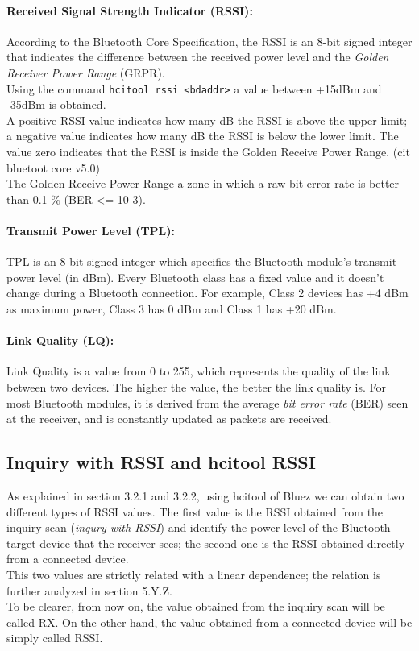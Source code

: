 \paragraph{Received Signal Strength Indicator (RSSI):}
According to the Bluetooth Core Specification, the RSSI is an 8-bit signed integer that indicates the difference between the received power level and the \textit{Golden Receiver Power Range} (GRPR). \\
Using the command \texttt{hcitool rssi \textless bdaddr\textgreater} a value between +15dBm and -35dBm is obtained. \\
A positive RSSI value indicates how many dB the RSSI is above the upper limit; a negative value indicates how many dB the RSSI is below the lower limit. The value zero indicates that the RSSI is inside the Golden Receive Power Range. (cit bluetoot core v5.0)\\
The Golden Receive Power Range a zone in which a raw bit error rate is better than 0.1 \% (BER <= 10-3).

\paragraph{Transmit Power Level (TPL):}
TPL is an 8-bit signed integer which specifies the Bluetooth module's transmit power level (in dBm). Every Bluetooth class has a fixed value and it doesn't change during a Bluetooth connection. For example, Class 2 devices has +4 dBm as maximum power, Class 3 has 0 dBm and Class 1 has +20 dBm.

\paragraph{Link Quality (LQ):}
Link Quality is a value from 0 to 255, which represents the quality of the link between two devices. The higher the value, the better the link quality is. For most Bluetooth modules, it is derived from the average \textit{bit error rate} (BER) seen at the receiver, and is constantly updated as packets are received.

\subsection{Inquiry with RSSI and hcitool RSSI}
As explained in section 3.2.1 and 3.2.2, using hcitool of Bluez we can obtain two different types of RSSI values.
The first value is the RSSI obtained from the inquiry scan (\textit{inqury with RSSI}) and identify the power level of the Bluetooth target device that the receiver sees; the second one is the RSSI obtained directly from a connected device.\\
This two values are strictly related with a linear dependence; the relation is further analyzed in section 5.Y.Z. \\
To be clearer, from now on, the value obtained from the inquiry scan will be called RX. On the other hand, the value obtained from a connected device will be simply called RSSI.\\

